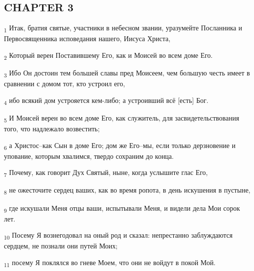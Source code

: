 \subsection{CHAPTER 3}
\begin{tcolorbox}
\textsubscript{1} Итак, братия святые, участники в небесном звании, уразумейте Посланника и Первосвященника исповедания нашего, Иисуса Христа,
\end{tcolorbox}
\begin{tcolorbox}
\textsubscript{2} Который верен Поставившему Его, как и Моисей во всем доме Его.
\end{tcolorbox}
\begin{tcolorbox}
\textsubscript{3} Ибо Он достоин тем большей славы пред Моисеем, чем большую честь имеет в сравнении с домом тот, кто устроил его,
\end{tcolorbox}
\begin{tcolorbox}
\textsubscript{4} ибо всякий дом устрояется кем-либо; а устроивший всё [есть] Бог.
\end{tcolorbox}
\begin{tcolorbox}
\textsubscript{5} И Моисей верен во всем доме Его, как служитель, для засвидетельствования того, что надлежало возвестить;
\end{tcolorbox}
\begin{tcolorbox}
\textsubscript{6} а Христос--как Сын в доме Его; дом же Его--мы, если только дерзновение и упование, которым хвалимся, твердо сохраним до конца.
\end{tcolorbox}
\begin{tcolorbox}
\textsubscript{7} Почему, как говорит Дух Святый, ныне, когда услышите глас Его,
\end{tcolorbox}
\begin{tcolorbox}
\textsubscript{8} не ожесточите сердец ваших, как во время ропота, в день искушения в пустыне,
\end{tcolorbox}
\begin{tcolorbox}
\textsubscript{9} где искушали Меня отцы ваши, испытывали Меня, и видели дела Мои сорок лет.
\end{tcolorbox}
\begin{tcolorbox}
\textsubscript{10} Посему Я вознегодовал на оный род и сказал: непрестанно заблуждаются сердцем, не познали они путей Моих;
\end{tcolorbox}
\begin{tcolorbox}
\textsubscript{11} посему Я поклялся во гневе Моем, что они не войдут в покой Мой.
\end{tcolorbox}
